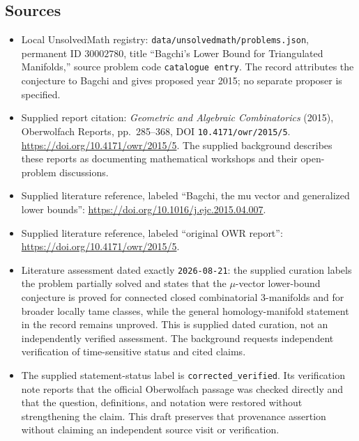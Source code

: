 \documentclass[11pt]{article}
\begin{document}
\subsection{Sources}
\begin{itemize}
\item Local UnsolvedMath registry: \texttt{data/unsolvedmath/problems.json}, permanent ID \(30002780\), title ``Bagchi's Lower Bound for Triangulated Manifolds,'' source problem code \texttt{catalogue entry}. The record attributes the conjecture to Bagchi and gives proposed year 2015; no separate proposer is specified.
\item Supplied report citation: \emph{Geometric and Algebraic Combinatorics} (2015), Oberwolfach Reports, pp.\ 285--368, DOI \texttt{10.4171/owr/2015/5}. \url{https://doi.org/10.4171/owr/2015/5}. The supplied background describes these reports as documenting mathematical workshops and their open-problem discussions.
\item Supplied literature reference, labeled ``Bagchi, the mu vector and generalized lower bounds'': \url{https://doi.org/10.1016/j.ejc.2015.04.007}.
\item Supplied literature reference, labeled ``original OWR report'': \url{https://doi.org/10.4171/owr/2015/5}.
\item Literature assessment dated exactly \texttt{2026-08-21}: the supplied curation labels the problem partially solved and states that the \(\mu\)-vector lower-bound conjecture is proved for connected closed combinatorial \(3\)-manifolds and for broader locally tame classes, while the general homology-manifold statement in the record remains unproved. This is supplied dated curation, not an independently verified assessment. The background requests independent verification of time-sensitive status and cited claims.
\item The supplied statement-status label is \texttt{corrected\_verified}. Its verification note reports that the official Oberwolfach passage was checked directly and that the question, definitions, and notation were restored without strengthening the claim. This draft preserves that provenance assertion without claiming an independent source visit or verification.
\end{itemize}
\end{document}
